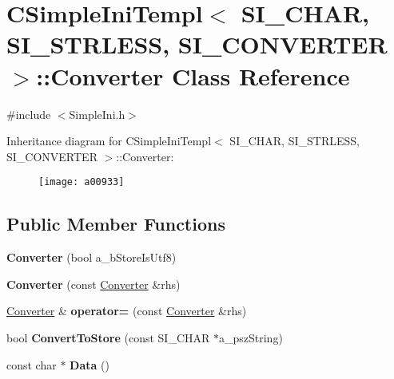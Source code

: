 \hypertarget{a00933}{}\section{C\+Simple\+Ini\+Templ$<$ S\+I\+\_\+\+C\+H\+AR, S\+I\+\_\+\+S\+T\+R\+L\+E\+SS, S\+I\+\_\+\+C\+O\+N\+V\+E\+R\+T\+ER $>$\+:\+:Converter Class Reference}
\label{a00933}


{\ttfamily \#include $<$Simple\+Ini.\+h$>$}

Inheritance diagram for C\+Simple\+Ini\+Templ$<$ S\+I\+\_\+\+C\+H\+AR, S\+I\+\_\+\+S\+T\+R\+L\+E\+SS, S\+I\+\_\+\+C\+O\+N\+V\+E\+R\+T\+ER $>$\+:\+:Converter\+:\begin{figure}[H]
\begin{center}
\leavevmode
\texttt{[image: a00933]}
\end{center}
\end{figure}
\subsection*{Public Member Functions}
\begin{DoxyCompactItemize}
\item 
\mbox{\label{a00933_ab8e740b211e4ece127d4d25773ba7e42}} 
{\bfseries Converter} (bool a\+\_\+b\+Store\+Is\+Utf8)
\item 
\mbox{\label{a00933_a2f6e993014ed5d60c6e890e55beb0805}} 
{\bfseries Converter} (const \hyperlink{a00933}{Converter} \&rhs)
\item 
\mbox{\label{a00933_af858c01c6a7e4ce9fafd18abc9e0ac1b}} 
\hyperlink{a00933}{Converter} \& {\bfseries operator=} (const \hyperlink{a00933}{Converter} \&rhs)
\item 
\mbox{\label{a00933_a4e4186867214b54326cf622e323c9f2f}} 
bool {\bfseries Convert\+To\+Store} (const S\+I\+\_\+\+C\+H\+AR $\ast$a\+\_\+psz\+String)
\item 
\mbox{\label{a00933_a918bbd4f861a2872e148bc9481ac80bb}} 
const char $\ast$ {\bfseries Data} ()
\end{DoxyCompactItemize}


